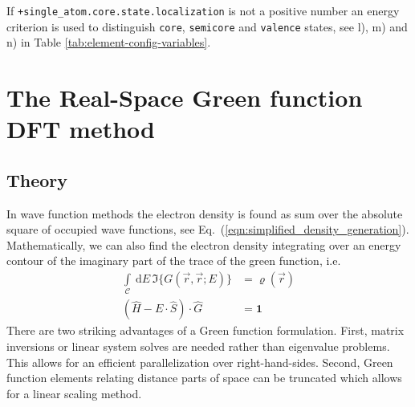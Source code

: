 \documentclass[oribibl]{llncs}
\newcommand{\ttt}[1]{\texttt{#1}}
\begin{document}
\noindent
If \ttt{+single\_atom.core.state.localization} is not a positive number
an energy criterion is used to distinguish \ttt{core}, \ttt{semicore} and \ttt{valence} states, see l), m) and n) in Table \ref{tab:element-config-variables}.









\cleardoublepage
\newpage

\section{The Real-Space Green function DFT method} \label{sec:green}

\subsection{Theory}
In wave function methods the electron density is found as sum over the absolute square of occupied wave functions, see Eq.~(\ref{eqn:simplified_density_generation}).
Mathematically, we can also find the electron density integrating over an energy contour of the imaginary part of the trace of the green function, i.e.
\begin{align}
  \int\limits_{\mathcal C} \  \mathrm{d}E \, \Im\{ G(\vec r, \vec r; E) \} &= \varrho(\vec r) \\
  \left( \hat H - E \cdot \hat S \right) \cdot \hat G &= \mathbf{1}
\end{align}
There are two striking advantages of a Green function formulation.
First, matrix inversions or linear system solves are needed rather than eigenvalue problems.
This allows for an efficient parallelization over right-hand-sides.
Second, Green function elements relating distance parts of space can be truncated which allows for a linear scaling method.
\end{document}
